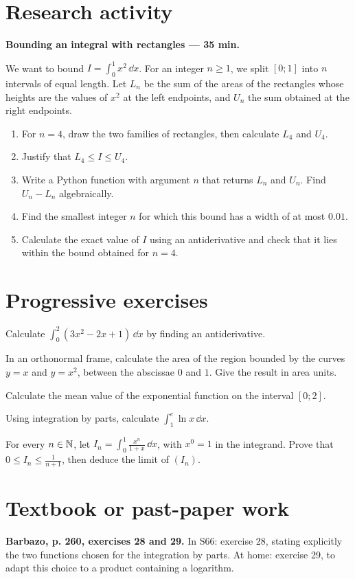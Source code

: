 \section{Research activity}\textbf{Bounding an integral with rectangles --- 35 min.}\par We want to bound $I=\displaystyle\int_0^1x^2\,\dd x$. For an integer $n\ge1$, we split $[0;1]$ into $n$ intervals of equal length. Let $L_n$ be the sum of the areas of the rectangles whose heights are the values of $x^2$ at the left endpoints, and $U_n$ the sum obtained at the right endpoints.
\begin{enumerate}\item For $n=4$, draw the two families of rectangles, then calculate $L_4$ and $U_4$.
\item Justify that $L_4\le I\le U_4$.
\item Write a Python function with argument $n$ that returns $L_n$ and $U_n$. Find $U_n-L_n$ algebraically.
\item Find the smallest integer $n$ for which this bound has a width of at most $0.01$.
\item Calculate the exact value of $I$ using an antiderivative and check that it lies within the bound obtained for $n=4$.\end{enumerate}

\section{Progressive exercises}

Calculate $\displaystyle\int_0^2(3x^2-2x+1)\,\dd x$ by finding an antiderivative.

In an orthonormal frame, calculate the area of the region bounded by the curves $y=x$ and $y=x^2$, between the abscissae $0$ and $1$. Give the result in area units.

Calculate the mean value of the exponential function on the interval $[0;2]$.

Using integration by parts, calculate $\displaystyle\int_1^e\ln x\,\dd x$.

For every $n\in\mathbb N$, let $I_n=\displaystyle\int_0^1\frac{x^n}{1+x}\,\dd x$, with $x^0=1$ in the integrand. Prove that $0\le I_n\le\frac1{n+1}$, then deduce the limit of $(I_n)$.

\section{Textbook or past-paper work}\textbf{Barbazo, p. 260, exercises 28 and 29.} In S66: exercise 28, stating explicitly the two functions chosen for the integration by parts. At home: exercise 29, to adapt this choice to a product containing a logarithm.


